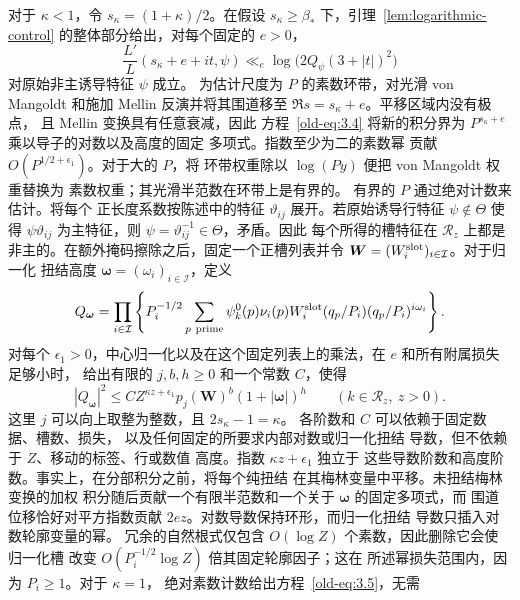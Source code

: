 \documentclass[11pt,a4paper]{article}
\numberwithin{equation}{section}
\numberwithin{figure}{section}
\theoremstyle{definition}
\theoremstyle{remark}
\begin{document}
对于 \(\kappa<1\)，令 \(s_\kappa=(1+\kappa)/2\)。在假设
\(s_\kappa\ge\beta_*\) 下，引理~\ref{lem:logarithmic-control} 的整体部分给出，对每个固定的 \(e>0\)，
\begin{equation}
 \frac{L'}{L}(s_\kappa+e+it,\psi)
 \ll_e \log\!\bigl(2Q_\psi(3+|t|)^2\bigr)
 \label{old-eq:3.4}
\end{equation}
对原始非主诱导特征 \(\psi\) 成立。
为估计尺度为 \(P\) 的素数环带，对光滑 von Mangoldt 和施加 Mellin 反演并将其围道移至
\(\Re s=s_\kappa+e\)。平移区域内没有极点，
且 Mellin 变换具有任意衰减，因此
方程~\eqref{old-eq:3.4} 将新的积分界为
\(P^{s_\kappa+e}\) 乘以导子的对数以及高度的固定
多项式。指数至少为二的素数幂
贡献 \(O(P^{1/2+\epsilon_1})\)。对于大的 \(P\)，将
环带权重除以 \(\log(Py)\) 便把 von Mangoldt 权重替换为
素数权重；其光滑半范数在环带上是有界的。
有界的 \(P\) 通过绝对计数来估计。将每个
正长度系数按陈述中的特征 \(\vartheta_{ij}\)
展开。若原始诱导行特征
\(\psi\notin\Theta\) 使得 \(\psi\vartheta_{ij}\) 为主特征，则
\(\psi=\vartheta_{ij}^{-1}\in\Theta\)，矛盾。因此
每个所得的槽特征在 \(\mathcal R_z\) 上都是非主的。在额外掩码擦除之后，固定一个正槽列表并令
\(\boldsymbol W=(W_i^{\rm slot})_{i\in\mathcal I}\)。对于归一化
扭结高度 \(\boldsymbol\omega=(\omega_i)_{i\in\mathcal I}\)，定义
\[
 Q_{\boldsymbol\omega}
 =\prod_{i\in\mathcal I}\left\{P_i^{-1/2}
   \sum_{p\ {\rm prime}}\psi_k^0(p)\nu_i(p)W_i^{\rm slot}(q_p/P_i)
                       (q_p/P_i)^{i\omega_i}\right\}.
\]
对每个 \(\epsilon_1>0\)，中心归一化以及在这个固定列表上的乘法，在 \(e\) 和所有附属损失足够小时，
给出有限的 \(j,b,h\ge0\) 和一个常数 \(C\)，使得
\begin{equation}
 |Q_{\boldsymbol\omega}|^2
 \le C Z^{\kappa z+\epsilon_1}p_j(\boldsymbol W)^b
                 (1+|\boldsymbol\omega|)^h
 \qquad(k\in\mathcal R_z,\ z>0).
 \label{old-eq:3.5}
\end{equation}
这里 \(j\) 可以向上取整为整数，且 \(2s_\kappa-1=\kappa\)。
各阶数和 \(C\) 可以依赖于固定数据、槽数、损失，
以及任何固定的所要求内部对数或归一化扭结
导数，但不依赖于 \(Z\)、移动的标签、行或数值
高度。指数 \(\kappa z+\epsilon_1\) 独立于
这些导数阶数和高度阶数。事实上，在分部积分之前，将每个纯扭结
在其梅林变量中平移。未扭结梅林变换的加权
积分随后贡献一个有限半范数和一个关于 \(\boldsymbol\omega\) 的固定多项式，而
围道位移恰好对平方指数贡献 \(2ez\)。对数导数保持环形，而归一化扭结
导数只插入对数轮廓变量的幂。
冗余的自然根式仅包含
\(O(\log Z)\) 个素数，因此删除它会使归一化槽
改变 \(O(P_i^{-1/2}\log Z)\) 倍其固定轮廓因子；这在
所述幂损失范围内，因为 \(P_i\ge1\)。对于 \(\kappa=1\)，
绝对素数计数给出方程~\eqref{old-eq:3.5}，无需
\end{document}
